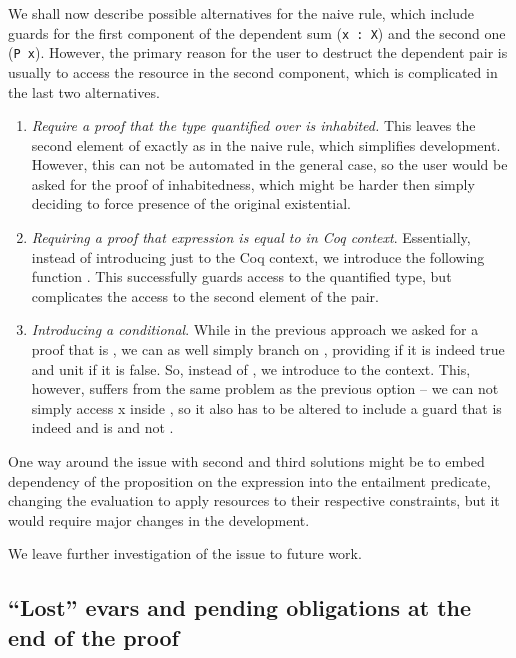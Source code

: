 We shall now describe possible alternatives for the naive rule, which include guards for the first component of the dependent sum (\texttt{x : X}) and the second one (\texttt{P x}).
However, the primary reason for the user to destruct the dependent pair is usually to access the resource in the second component, which is complicated in the last two alternatives.
\begin{enumerate}
\item \emph{Require a proof that the type quantified over is inhabited.}
  This leaves the second element of exactly as in the naive rule, which simplifies development.
  However, this can not be automated in the general case, so the user would be asked for the proof of inhabitedness, which might be harder then simply deciding to force presence of the original existential.
\item \emph{Requiring a proof that expression is equal to \true in Coq context}.
  Essentially, instead of introducing just  to the Coq context, we introduce the following function .
  This successfully guards access to the quantified type, but complicates the access to the second element of the pair.
\item \emph{Introducing a conditional}.
  While in the previous approach we asked for a proof that  is \true, we can as well simply branch on , providing  if it is indeed true and unit if it is false.
  So, instead of , we introduce  to the context.
  This, however, suffers from the same problem as the previous option -- we can not simply access x inside , so it also has to be altered to include a guard that  is indeed \true and  is  and not .
\end{enumerate}

One way around the issue with second and third solutions might be to embed dependency of the proposition on the expression into the entailment predicate, changing the evaluation to apply resources to their respective constraints, but it would require major changes in the development.

We leave further investigation of the issue to future work.


\subsection{``Lost'' evars and pending obligations at the end of the proof}
\label{subsec:hanging-obligations}

